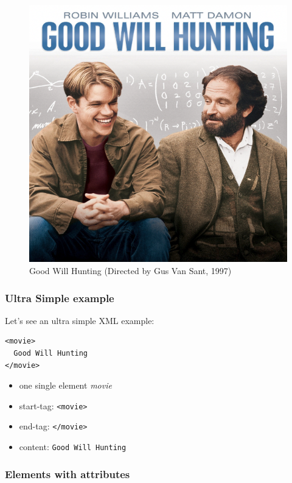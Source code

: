 \documentclass[
]{book}
\providecommand{\tightlist}{%
  \setlength{\itemsep}{0pt}\setlength{\parskip}{0pt}}
\begin{document}
\begin{figure}

{\centering \includegraphics[width=0.5\linewidth]{images/xml/xml-good-will-hunting} 

}

\caption{Good Will Hunting (Directed by Gus Van Sant, 1997)}\label{fig:unnamed-chunk-16}
\end{figure}

\hypertarget{ultra-simple-example}{%
\subsubsection*{Ultra Simple example}\label{ultra-simple-example}}

Let's see an ultra simple XML example:

\begin{verbatim}
<movie>
  Good Will Hunting
</movie>
\end{verbatim}

\begin{itemize}
\tightlist
\item
  one single element \emph{movie}
\item
  start-tag: \texttt{\textless{}movie\textgreater{}}
\item
  end-tag: \texttt{\textless{}/movie\textgreater{}}
\item
  content: \texttt{Good\ Will\ Hunting}
\end{itemize}

\hypertarget{elements-with-attributes}{%
\subsubsection*{Elements with attributes}\label{elements-with-attributes}}
\end{document}
